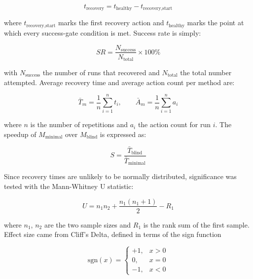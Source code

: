 \documentclass[conference]{IEEEtran}
\begin{document}
\begin{equation}
    t_\text{recovery} = t_\text{healthy} - t_{\text{recovery,start}}
    \label{rq:recovery_time}
\end{equation}

where $t_{\text{recovery,start}}$ marks the first recovery action and $t_{\text{healthy}}$ marks the point at which every success-gate condition is met. Success rate is simply:

\begin{equation}
    SR = \frac{N_\text{success}}{N_\text{total}} \times 100\%
    \label{eq:success_rate}
\end{equation}

with $N_{\text{success}}$ the number of runs that recovered and $N_{\text{total}}$ the total number attempted. Average recovery time and average action count per method are:

\begin{equation}
    \bar{T}_m = \frac{1}{n}\sum_{i=1}^{n} t_i, \qquad
    \bar{A}_m = \frac{1}{n}\sum_{i=1}^{n} a_i
    \label{eq:means}
\end{equation}

where $n$ is the number of repetitions and $a_i$ the action count for run $i$. The speedup of $M_\text{minimal}$ over $M_\text{blind}$ is expressed as:

\begin{equation}
    S = \frac{\bar{T}_\text{blind}}{\bar{T}_\text{minimal}}
    \label{eq:speedup}
\end{equation}

Since recovery times are unlikely to be normally distributed, significance was tested with the Mann-Whitney U statistic:

\begin{equation}
    U = n_1 n_2 + \frac{n_1(n_1+1)}{2} - R_1
    \label{eq:mannwhitney}
\end{equation}

where $n_1$, $n_2$ are the two sample sizes and $R_1$ is the rank sum of the first sample. Effect size came from Cliff's Delta, defined in terms of the sign function

\begin{equation}
    \text{sgn}(x) = \begin{cases} +1, & x > 0 \\ 0, & x = 0 \\ -1, & x < 0 \end{cases}
    \label{eq:sign}
\end{equation}
\end{document}
